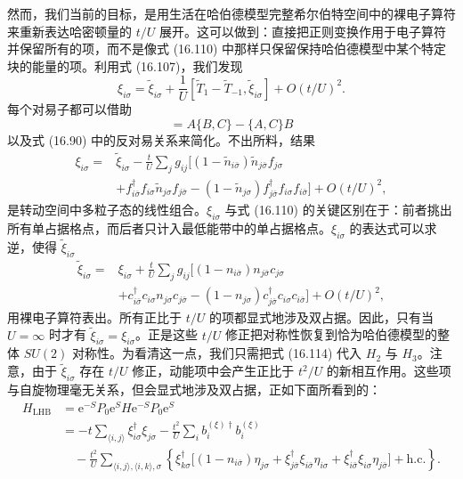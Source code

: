 然而，我们当前的目标，是用生活在哈伯德模型完整希尔伯特空间中的裸电子算符来重新表达哈密顿量的 $t/U$ 展开。这可以做到：直接把正则变换作用于电子算符并保留所有的项，而不是像式 (16.110) 中那样只保留保持哈伯德模型中某个特定块的能量的项。利用式 (16.107)，我们发现
\begin{equation*}
\xi_{i\sigma}=\tilde{\xi}_{i\sigma}+\frac{1}{U}[\tilde{T}_{1}-\tilde{T}_{-1},\tilde{\xi}_{i\sigma}]+O(t/U)^{2}.\tag{16.111}
\end{equation*}
每个对易子都可以借助
\begin{equation*}
[AB,C]=A\{B,C\}-\{A,C\}B\tag{16.112}
\end{equation*}
以及式 (16.90) 中的反对易关系来简化。不出所料，结果
\begin{equation*}
\begin{aligned}
\xi_{i\sigma}={}&\tilde{\xi}_{i\sigma}-\frac{t}{U}\sum_{j}g_{ij}\big[(1-\tilde{n}_{i\bar{\sigma}})\tilde{n}_{j\bar{\sigma}}f_{j\sigma}\\
&+f^{\dagger}_{i\bar{\sigma}}f_{i\sigma}\tilde{n}_{j\sigma}f_{j\bar{\sigma}}-(1-\tilde{n}_{j\sigma})f^{\dagger}_{j\bar{\sigma}}f_{i\sigma}f_{i\bar{\sigma}}\big]+O(t/U)^{2},
\end{aligned}\tag{16.113}
\end{equation*}
是转动空间中多粒子态的线性组合。$\xi_{i\sigma}$ 与式 (16.110) 的关键区别在于：前者挑出所有单占据格点，而后者只计入最低能带中的单占据格点。$\xi_{i\sigma}$ 的表达式可以求逆，使得 $\tilde{\xi}_{i\sigma}$
\begin{equation*}
\begin{aligned}
\tilde{\xi}_{i\sigma}={}&\xi_{i\sigma}+\frac{t}{U}\sum_{j}g_{ij}\big[(1-n_{i\bar{\sigma}})n_{j\bar{\sigma}}c_{j\sigma}\\
&+c^{\dagger}_{i\bar{\sigma}}c_{i\sigma}n_{j\sigma}c_{j\bar{\sigma}}-(1-n_{j\sigma})c^{\dagger}_{j\bar{\sigma}}c_{i\sigma}c_{i\bar{\sigma}}\big]+O(t/U)^{2},
\end{aligned}\tag{16.114}
\end{equation*}
用裸电子算符表出。所有正比于 $t/U$ 的项都显式地涉及双占据。因此，只有当 $U=\infty$ 时才有 $\tilde{\xi}_{i\sigma}=\xi_{i\sigma}$。正是这些 $t/U$ 修正把对称性恢复到恰为哈伯德模型的整体 $SU(2)$ 对称性。为看清这一点，我们只需把式 (16.114) 代入 $H_{2}$ 与 $H_{3}$。注意，由于 $\tilde{\xi}_{i\sigma}$ 存在 $t/U$ 修正，动能项中会产生正比于 $t^{2}/U$ 的新相互作用。这些项与自旋物理毫无关系，但会显式地涉及双占据，正如下面所看到的：
\begin{align*}
H_{\mathrm{LHB}}&=\mathrm{e}^{-S}P_{0}\mathrm{e}^{S}H\mathrm{e}^{-S}P_{0}\mathrm{e}^{S}\\
&=-t\sum_{\langle i,j\rangle}\xi^{\dagger}_{i\sigma}\xi_{j\sigma}-\frac{t^{2}}{U}\sum_{i}b^{(\xi)\dagger}_{i}b^{(\xi)}_{i}\\
&\quad-\frac{t^{2}}{U}\sum_{\langle i,j\rangle,\langle i,k\rangle,\sigma}\left\{\xi^{\dagger}_{k\sigma}\big[(1-n_{i\bar{\sigma}})\eta_{j\sigma}+\xi^{\dagger}_{j\bar{\sigma}}\xi_{i\bar{\sigma}}\eta_{i\sigma}+\xi^{\dagger}_{i\bar{\sigma}}\xi_{i\sigma}\eta_{j\bar{\sigma}}\big]+\mathrm{h.c.}\right\}.\tag{16.115}
\end{align*}
